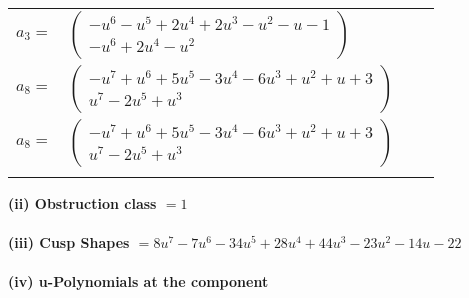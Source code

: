 \documentclass[1p]{elsarticle_modified}
\theoremstyle{definition}
\begin{document}
\begin{tabular}{m{7pt} m{180pt} m{7pt} m{180pt} }
\flushright $a_{3}=$&$\begin{pmatrix}- u^6- u^5+2 u^4+2 u^3- u^2- u-1\\- u^6+2 u^4- u^2\end{pmatrix}$ \\
\flushright $a_{8}=$&$\begin{pmatrix}- u^7+u^6+5 u^5-3 u^4-6 u^3+u^2+u+3\\u^7-2 u^5+u^3\end{pmatrix}$\\ \flushright $a_{8}=$&$\begin{pmatrix}- u^7+u^6+5 u^5-3 u^4-6 u^3+u^2+u+3\\u^7-2 u^5+u^3\end{pmatrix}$\\&\end{tabular}
\flushleft \textbf{(ii) Obstruction class $= 1$}\\~\\
\flushleft \textbf{(iii) Cusp Shapes $= 8 u^7-7 u^6-34 u^5+28 u^4+44 u^3-23 u^2-14 u-22$}\\~\\
\newpage\renewcommand{\arraystretch}{1}
\flushleft \textbf{(iv) u-Polynomials at the component}\newline \\
\end{document}
